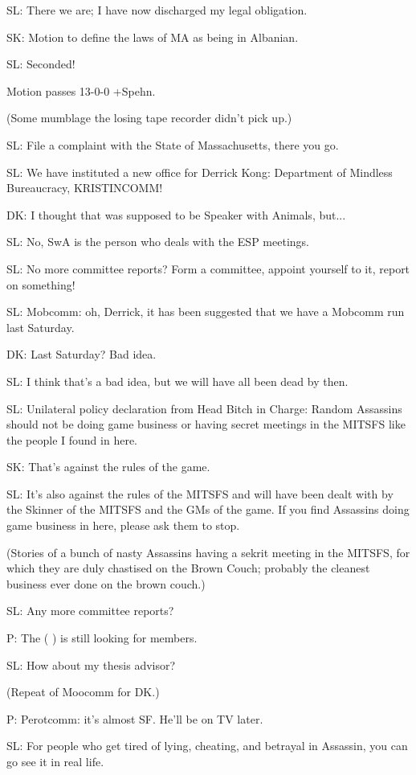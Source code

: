 \documentclass[12pt]{article}
\begin{document}
SL: There we are; I have now discharged my legal obligation.

SK: Motion to define the laws of MA as being in Albanian.

SL: Seconded!

Motion passes 13-0-0 +Spehn.

(Some mumblage the losing tape recorder didn't pick up.)

SL: File a complaint with the State of Massachusetts, there you go.

SL: We have instituted a new office for Derrick Kong: Department of Mindless Bureaucracy, KRISTINCOMM!

DK: I thought that was supposed to be Speaker with Animals, but...

SL: No, SwA is the person who deals with the ESP meetings.

SL: No more committee reports? Form a committee, appoint yourself to it, report on something!

SL: Mobcomm: oh, Derrick, it has been suggested that we have a Mobcomm run last Saturday.

DK: Last Saturday? Bad idea.

SL: I think that's a bad idea, but we will have all been dead by then.

SL: Unilateral policy declaration from Head Bitch in Charge: Random Assassins should not be doing game business or having secret meetings in the MITSFS like the people I found in here.

SK: That's against the rules of the game.

SL: It's also against the rules of the MITSFS and will have been dealt with by the Skinner of the MITSFS and the GMs of the game. If you find Assassins doing game business in here, please ask them to stop.

(Stories of a bunch of nasty Assassins having a sekrit meeting in the MITSFS, for which they are duly chastised on the Brown Couch; probably the cleanest business ever done on the brown couch.)

SL: Any more committee reports?

P: The ( ) is still looking for members.

SL: How about my thesis advisor?

(Repeat of Moocomm for DK.)

P: Perotcomm: it's almost SF. He'll be on TV later.

SL: For people who get tired of lying, cheating, and betrayal in Assassin, you can go see it in real life.
\end{document}
